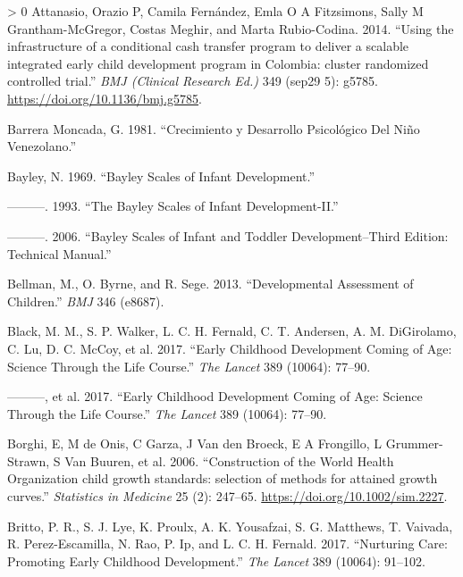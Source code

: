 \documentclass[
]{book}
\newlength{\cslhangindent}
\newenvironment{CSLReferences}[3] %
 {%
  \setlength{\parindent}{0pt}
  \ifodd #1 \everypar{\setlength{\hangindent}{\cslhangindent}}\ignorespaces\fi
  \ifnum #2 > 0
  \setlength{\parskip}{#2\baselineskip}
  \fi
 }%
 {}
\begin{document}
\hypertarget{refs}{}
\begin{CSLReferences}{1}{0}
\leavevmode\hypertarget{ref-Attanasio2014}{}%
Attanasio, Orazio P, Camila Fernández, Emla O A Fitzsimons, Sally M Grantham-McGregor, Costas Meghir, and Marta Rubio-Codina. 2014. {``{Using the infrastructure of a conditional cash transfer program to deliver a scalable integrated early child development program in Colombia: cluster randomized controlled trial.}''} \emph{BMJ (Clinical Research Ed.)} 349 (sep29 5): g5785. \url{https://doi.org/10.1136/bmj.g5785}.

\leavevmode\hypertarget{ref-barrera1981}{}%
Barrera Moncada, G. 1981. {``Crecimiento y Desarrollo Psicológico Del Niño Venezolano.''}

\leavevmode\hypertarget{ref-bayley1969}{}%
Bayley, N. 1969. {``Bayley Scales of Infant Development.''}

\leavevmode\hypertarget{ref-bayley1993}{}%
---------. 1993. {``The Bayley Scales of Infant Development-II.''}

\leavevmode\hypertarget{ref-bayley2006}{}%
---------. 2006. {``Bayley Scales of Infant and Toddler Development--Third Edition: Technical Manual.''}

\leavevmode\hypertarget{ref-bellman2013}{}%
Bellman, M., O. Byrne, and R. Sege. 2013. {``Developmental Assessment of Children.''} \emph{BMJ} 346 (e8687).

\leavevmode\hypertarget{ref-black2017}{}%
Black, M. M., S. P. Walker, L. C. H. Fernald, C. T. Andersen, A. M. DiGirolamo, C. Lu, D. C. McCoy, et al. 2017. {``Early Childhood Development Coming of Age: Science Through the Life Course.''} \emph{The Lancet} 389 (10064): 77--90.

\leavevmode\hypertarget{ref-black2017}{}%
---------, et al. 2017. {``Early Childhood Development Coming of Age: Science Through the Life Course.''} \emph{The Lancet} 389 (10064): 77--90.

\leavevmode\hypertarget{ref-borghi2006}{}%
Borghi, E, M de Onis, C Garza, J Van den Broeck, E A Frongillo, L Grummer-Strawn, S Van Buuren, et al. 2006. {``{Construction of the World Health Organization child growth standards: selection of methods for attained growth curves.}''} \emph{Statistics in Medicine} 25 (2): 247--65. \url{https://doi.org/10.1002/sim.2227}.

\leavevmode\hypertarget{ref-britto2017}{}%
Britto, P. R., S. J. Lye, K. Proulx, A. K. Yousafzai, S. G. Matthews, T. Vaivada, R. Perez-Escamilla, N. Rao, P. Ip, and L. C. H. Fernald. 2017. {``Nurturing Care: Promoting Early Childhood Development.''} \emph{The Lancet} 389 (10064): 91--102.


\end{CSLReferences}
\end{document}
